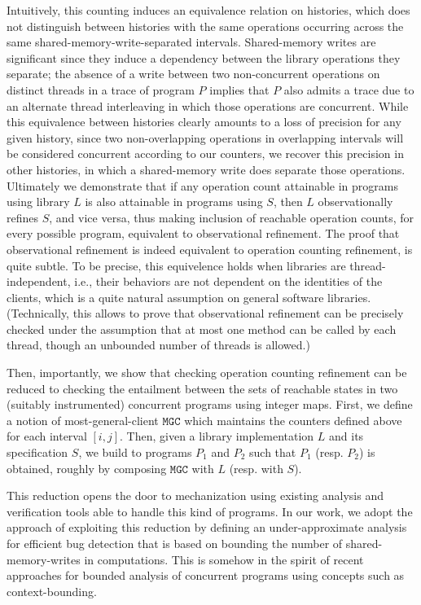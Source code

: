 Intuitively, this counting induces an equivalence relation on histories, which
does not distinguish between histories with the same operations occurring
across the same shared-memory-write-separated intervals. Shared-memory writes
are significant since they induce a dependency between the library operations
they separate; the absence of a write between two non-concurrent operations on
distinct threads in a trace of program $P$ implies that $P$ also admits a trace
due to an alternate thread interleaving in which those operations are
concurrent. While this equivalence between histories clearly amounts to a loss
of precision for any given history, since two non-overlapping operations in
overlapping intervals will be considered concurrent according to our counters,
we recover this precision in other histories, in which a shared-memory write
does separate those operations. Ultimately we demonstrate that if any operation
count attainable in programs using library $L$ is also attainable in programs
using $S$, then $L$ observationally refines $S$, and vice versa, thus making
inclusion of reachable operation counts, for every possible program, equivalent to observational refinement.
The proof that observational refinement is indeed equivalent to operation counting refinement, is quite subtle. To be precise, this equivelence holds when libraries are thread-independent, i.e., their behaviors are not dependent on the identities of the clients, which is a quite natural assumption on general software libraries. (Technically, this allows to prove that observational refinement can be precisely checked under the assumption that at most one method can be called by each thread, though an unbounded number of threads is allowed.) 

Then, importantly, we show that checking operation counting refinement can be reduced to checking the entailment between the sets of reachable states in two (suitably instrumented) concurrent programs using integer maps. First, we define a notion of most-general-client $\mathtt{MGC}$ which maintains the counters defined above for each interval $[i, j]$. Then, given a library implementation $L$ and its specification $S$, we build to programs $P_1$ and $P_2$ such that $P_1$ (resp. $P_2$) is obtained, roughly by composing $\mathtt{MGC}$ with $L$ (resp. with $S$). 

This reduction opens the door to mechanization using existing analysis and verification tools able to handle this kind of programs.
In our work, we adopt the approach of exploiting this reduction by defining an under-approximate analysis for efficient bug detection that is based on bounding the number of shared-memory-writes in computations. This is somehow in the spirit of recent approaches for bounded analysis of concurrent programs using concepts such as context-bounding.

